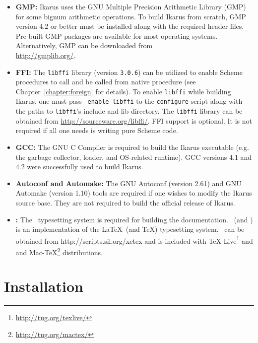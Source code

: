 \documentclass[onecolumn, 12pt, twoside, openright, dvipdfm]{book}
\begin{document}
\begin{itemize}
\item\textbf{GMP:} Ikarus uses the GNU Multiple Precision Arithmetic
Library (GMP) for some bignum arithmetic operations.  To build
Ikarus from scratch, GMP version 4.2 or better must be installed
along with the required header files.  Pre-built GMP packages  are
available for most operating systems.  Alternatively, GMP can be
downloaded from \\
\url{http://gmplib.org/}.


\item\textbf{FFI:} 
 The \texttt{libffi} library (version \texttt{3.0.6}) can be utilized 
to enable Scheme procedures to call and be called from native
procedure (see Chapter~\ref{chapter:foreign} for details).  
To enable
\texttt{libffi} while building Ikarus, one must pass
\texttt{--enable-libffi} to the \texttt{configure} script along with
the paths to \texttt{libffi}'s include and lib directory.
The \texttt{libffi} library can be obtained from
\url{http://sourceware.org/libffi/}.
FFI support is optional.  It is not required if all one needs is
writing pure Scheme code.




\item\textbf{GCC:} The GNU C Compiler is required to build the Ikarus
executable (e.g. the garbage collector, loader, and OS-related
runtime).  GCC versions 4.1 and 4.2 were successfully used to build
Ikarus.

\item\textbf{Autoconf and Automake:} The GNU Autoconf (version 2.61)
and GNU Automake (version 1.10) tools are required if one
wishes to modify the Ikarus source base.  They are not
required to build the official release of Ikarus.

\item\textbf{\XeLaTeX{}:}  The \XeLaTeX\ typesetting system is
required for building the documentation.  \XeLaTeX\ (and \XeTeX) is
an implementation of the \LaTeX\ (and \TeX) typesetting system.
\XeLaTeX\ can be obtained from \url{http://scripts.sil.org/xetex}
and is included with \TeX-Live\footnote{
\url{http://tug.org/texlive/}} and and
Mac-\TeX\footnote{\url{http://tug.org/mactex/}} distributions.


\end{itemize}

\section{Installation}
\end{document}
